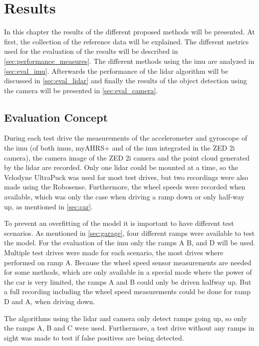 \chapter{Results}
\label{ch:Results}

In this chapter the results of the different proposed methods will be presented.
At first, the collection of the reference data will be explained.
The different metrics used for the evaluation of the results will be described in \cref{sec:performance_measures}.
The different methods using the \gls{imu} are analyzed in \cref{sec:eval_imu}.
Afterwards the performance of the \gls{lidar} algorithm will be discussed in \cref{sec:eval_lidar} and finally the results of the object detection using the camera will be presented in \cref{sec:eval_camera}.



\section{Evaluation Concept}
During each test drive the measurements of the accelerometer and gyroscope of the \gls{imu} (of both \glspl{imu}, myAHRS+ and of the \gls{imu} integrated in the ZED 2i camera), the camera image of the ZED 2i camera and the point cloud generated by the \gls{lidar} are recorded.
Only one \gls{lidar} could be mounted at a time, so the Velodyne UltraPuck was used for most test drives, but two recordings were also made using the Robosense.
Furthermore, the wheel speeds were recorded when available, which was only the case when driving a ramp down or only half-way up, as mentioned in \cref{sec:car}.\par
To prevent an overfitting of the model it is important to have different test scenarios.
As mentioned in \cref{sec:garage}, four different ramps were available to test the model.
For the evaluation of the \gls{imu} only the ramps A B, and D will be used.
Multiple test drives were made for each scenario, the most drives where performed on ramp A.
Because the wheel speed sensor measurements are needed for some methods, which are only available in a special mode where the power of the car is very limited, the ramps A and B could only be driven halfway up.
But a full recording including the wheel speed measurements could be done for ramp D and A, when driving down.\par
The algorithms using the \gls{lidar} and camera only detect ramps going up, so only the ramps A, B and C were used.
Furthermore, a test drive without any ramps in sight was made to test if false positives are being detected.



